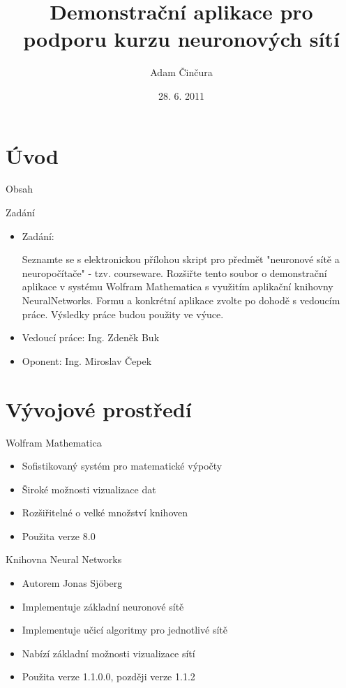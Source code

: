 \documentclass{beamer}
\title[Demonstrační aplikace pro podporu kurzu neuronových sítí]{Demonstrační aplikace pro podporu kurzu neuronových sítí}
\author{Adam Činčura}
\institute{ČVUT - FEL}
\date{28. 6. 2011}
\begin{document}
\begin{frame}
\titlepage
\end{frame}
\section{Úvod}
\begin{frame}{Obsah}
   \tableofcontents
\end{frame}
\begin{frame}{Zadání}

\begin{itemize}
\item Zadání:

Seznamte se s elektronickou přílohou skript pro předmět "neuronové sítě a neuropočítače" - tzv. courseware. Rozšiřte tento soubor o demonstrační aplikace v systému Wolfram Mathematica s využitím aplikační knihovny NeuralNetworks. Formu a konkrétní aplikace zvolte po dohodě s vedoucím práce. Výsledky práce budou použity ve výuce.


\item Vedoucí práce: Ing. Zdeněk Buk
\item Oponent: Ing. Miroslav Čepek
\end{itemize}

\end{frame}




\section{Vývojové prostředí}
\begin{frame}{Wolfram Mathematica}
\begin{itemize}
\item Sofistikovaný systém pro matematické výpočty
\item Široké možnosti vizualizace dat
\item Rozšiřitelné o velké množství knihoven 
\item Použita verze 8.0
\end{itemize}

\end{frame}

\begin{frame}{Knihovna Neural Networks}
\begin{itemize}
\item Autorem Jonas Sjöberg 
\item Implementuje základní neuronové sítě
\item Implementuje učicí algoritmy pro jednotlivé sítě
\item Nabízí základní možnosti vizualizace sítí
\item Použita verze 1.1.0.0, později verze 1.1.2

\end{itemize}
\end{frame}
\end{document}
